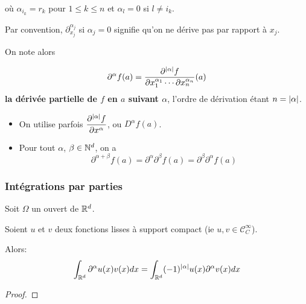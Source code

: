 où $\alpha_{i_{k}} = r_{k}$ pour $1 \leq k \leq n$ et $\alpha_{l} = 0$ si $l
\neq i_{k}$.

\begin{remarque}
	Par convention, $\partial_{x_{j}}^{\alpha_{j}}$ si $\alpha_{j} = 0$ signifie
	qu'on ne dérive pas par rapport à $x_{j}$.
\end{remarque}

On note alors

\begin{equation*}
	\partial^{\alpha} f (a) = \frac{\partial^{|\alpha|} f}{\partial
		x_{1}^{\alpha_{1}} \cdots \partial x_{n}^{\alpha_{n}}} (a)
\end{equation*}
\textbf{la dérivée partielle de $f$ en $a$ suivant $\alpha$}, l'ordre de
dérivation étant $n = |\alpha|$.

\begin{remarque}
	\begin{itemize}
		\item On utilise parfois $\displaystyle \frac{\partial^{|\alpha|} f}{\partial
		x^{\alpha}}$, ou $D^{\alpha} f(a)$.
	\item Pour tout $\alpha$, $\beta \in \mathbb{N}^{d}$, on a
		\begin{equation*}
			\partial^{\alpha +
			\beta} f(a) = \partial^{\alpha} \partial^{\beta} f (a) = \partial^{\beta}
			\partial^{\alpha} f (a)
		\end{equation*}
	\end{itemize}
\end{remarque}
\subsubsection{Intégrations par parties}

\begin{proposition}
	Soit $\Omega$ un ouvert de $\mathbb{R}^{d}$.

	Soient $u$ et $v$ deux fonctions lisses à support compact (ie $u, v \in
	\mathcal{C}_{C}^{\infty}$).

	Alors:
	\begin{equation*}
		\int_{\mathbb{R}^{d}} \partial^{\alpha} u(x) v(x) dx = \int_{\mathbb{R}^{d}}
		(-1)^{|\alpha|} u(x) \partial^{\alpha}v(x) dx
	\end{equation*}
\end{proposition}

\ifdefined\outputproof
\begin{proof}

\end{proof}
\fi

